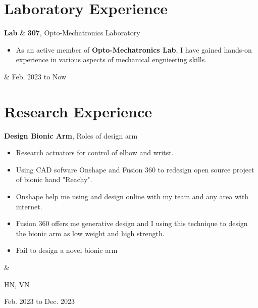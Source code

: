 \documentclass[10pt, letterpaper]{article}
\newenvironment{highlights}{
        \begin{itemize}[
                topsep=0pt,
                parsep=0.10 cm,
                partopsep=0pt,
                itemsep=0pt,
                after=\vspace{-1\baselineskip},
                leftmargin=0.4 cm + 3pt
            ]
    }{
        \end{itemize}
    } %
\let\originalTabularx\tabularx
\let\originalEndTabularx\endtabularx
\renewenvironment{tabularx}{\bgroup\centering\originalTabularx}{\originalEndTabularx\par\egroup}
\begin{document}
    \section{Laboratory Experience}
        \begin{tabularx}{
            \textwidth-0.4 cm-0.13cm
        }{
            L{0.85cm}
            K{0.2 cm}
            R{4.1 cm}
        }
            \textbf{Lab}
            &
            \textbf{307}, Opto-Mechatronics Laboratory

            \vspace{0.10 cm}

            \begin{highlights}
                \item As an active member of \textbf{Opto-Mechatronics Lab}, I have gained hands-on experience in various aspects of mechanical engnieering skills.
            \end{highlights}
            &
            Feb. 2023 to Now
        \end{tabularx}

    \section{Research Experience}

        \begin{tabularx}{
            \textwidth-0.4 cm-0.13cm
        }{
            K{0.2 cm}
            R{4.1 cm}
        }
            \textbf{Design Bionic Arm}, Roles of design arm

            \vspace{0.10 cm}

            \begin{highlights}
                \item Research actuators for control of elbow and writst.
                \item Using CAD sofware Onshape and Fusion 360 to redesign open source project of bionic hand "Reachy".
                \item Onshape help me using and design online with my team and any area with internet.
                \item Fusion 360 offers me generative design and I using this technique to design the bionic arm as low weight and high strength.
                \item Fail to design a novel bionic arm 
            \end{highlights}
            &

            HN, VN 
            
            Feb. 2023 to Dec. 2023

        \end{tabularx}
\end{document}

